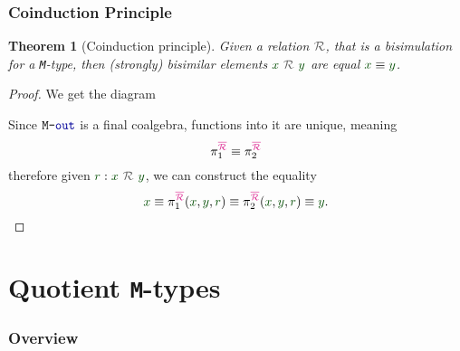 \documentclass[xelatex,mathserif,serif,notheorems]{beamer} %
\theoremstyle{plain} %
\newtheorem{thm}{Theorem}[section]
\theoremstyle{definition}
\theoremstyle{remark}
\newcommand*{\term}[1]{\textcolor{green!30!black}{#1}} %
\newcommand*{\type}[1]{\textcolor{magenta!90!black}{#1}}
\newcommand*{\coalg}[2]{#1\texttt{-}#2}
\newcommand*{\relation}[1]{\textcolor{gray!75!black}{\ensuremath{\mathtt{#1}}}}
\newcommand*{\constant}[1]{\textcolor{orange!60!black}{\ensuremath{\mathtt{#1}}}}
\newcommand*{\function}[1]{\textcolor{blue!60!black}{\ensuremath{\mathtt{#1}}}}
\newcommand*{\typeformer}[1]{\ensuremath{\mathtt{#1}}}
\newcommand{\setlengths}{
  \setlength{\abovedisplayskip}{4pt}
  \setlength{\belowdisplayskip}{4pt}
  \setlength{\abovedisplayshortskip}{2pt}
  \setlength{\belowdisplayshortskip}{2pt}
}
\begin{document}
\begin{frame}[fragile]
  \frametitle{Coinduction Principle}
  \begin{thm}[Coinduction principle]\setlengths
    Given a relation \(\relation{\mathcal{R}}\), that is a bisimulation for a \texttt{M}-type, then (strongly) bisimilar elements \(\term{x}~\relation{\mathcal{R}}~\term{y}\) are equal \(\term{x} \equiv \term{y}\).
  \end{thm}
  \begin{proof}\setlengths
    We get the diagram
    \begin{figure}[h]
      \centering
    \end{figure}
    Since \(\coalg{\typeformer{M}}{\function{out}}\) is a final coalgebra, functions into it are unique, meaning
    \begin{equation}
    \pi_1^{\type{\overline{\mathcal{R}}}} \equiv \pi_2^{\type{\overline{\mathcal{R}}}} %
  \end{equation}
    therefore given \(\term{r} : \term{x}~\relation{\mathcal{R}}~\term{y}\), we can construct the equality
    \begin{equation}
      \term{x} \equiv \pi_1^{\type{\overline{\mathcal{R}}}} (\term{x}, \term{y}, \term{r}) \equiv \pi_2^{\type{\overline{\mathcal{R}}}} (\term{x}, \term{y}, \term{r}) \equiv \term{y}.
    \end{equation}
  \end{proof}  
\end{frame}

\section{Quotient \texttt{M}-types}
\begin{frame}
  \frametitle{Overview}
  \tableofcontents[currentsection]
\end{frame}
\end{document}
